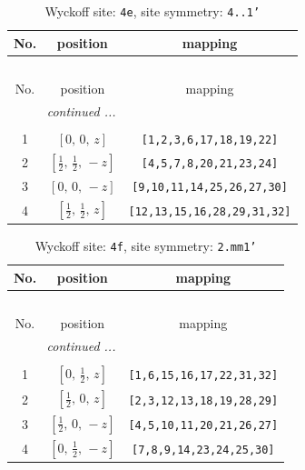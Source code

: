 \documentclass[fleqn,8pt]{jsarticle}
\begin{document}
\begin{longtable}{ccc}
\caption{Wyckoff site: {\tt 4e}, site symmetry: {\tt 4..1'}}
 \\
 \hline \hline
No. & position & mapping \\ \hline \endfirsthead

\multicolumn{2}{l}{\tablename\ \thetable{}} \\
 \hline \hline
No. & position & mapping \\ \hline \endhead

 \hline \hline
\multicolumn{2}{r}{\footnotesize\it continued ...} \\ \endfoot

 \hline \hline
\multicolumn{2}{r}{} \\ \endlastfoot

1 & $\left[ 0,\, 0,\, z \right]$ & {\tt [1,2,3,6,17,18,19,22]} \\ \hline
2 & $\left[ \frac{1}{2},\, \frac{1}{2},\, - z \right]$ & {\tt [4,5,7,8,20,21,23,24]} \\ \hline
3 & $\left[ 0,\, 0,\, - z \right]$ & {\tt [9,10,11,14,25,26,27,30]} \\ \hline
4 & $\left[ \frac{1}{2},\, \frac{1}{2},\, z \right]$ & {\tt [12,13,15,16,28,29,31,32]} \\
\end{longtable}
\renewcommand{\arraystretch}{1.2}
\begin{longtable}{ccc}
\caption{Wyckoff site: {\tt 4f}, site symmetry: {\tt 2.mm1'}}
 \\
 \hline \hline
No. & position & mapping \\ \hline \endfirsthead

\multicolumn{2}{l}{\tablename\ \thetable{}} \\
 \hline \hline
No. & position & mapping \\ \hline \endhead

 \hline \hline
\multicolumn{2}{r}{\footnotesize\it continued ...} \\ \endfoot

 \hline \hline
\multicolumn{2}{r}{} \\ \endlastfoot

1 & $\left[ 0,\, \frac{1}{2},\, z \right]$ & {\tt [1,6,15,16,17,22,31,32]} \\ \hline
2 & $\left[ \frac{1}{2},\, 0,\, z \right]$ & {\tt [2,3,12,13,18,19,28,29]} \\ \hline
3 & $\left[ \frac{1}{2},\, 0,\, - z \right]$ & {\tt [4,5,10,11,20,21,26,27]} \\ \hline
4 & $\left[ 0,\, \frac{1}{2},\, - z \right]$ & {\tt [7,8,9,14,23,24,25,30]} \\
\end{longtable}
\end{document}
